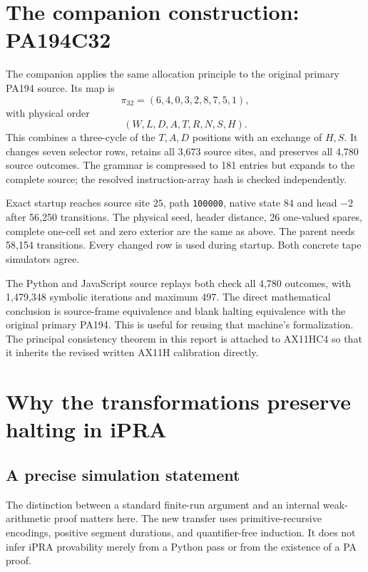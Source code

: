 \documentclass[11pt,letterpaper]{article}
\begin{document}


\section{The companion construction: PA194C32}

The companion applies the same allocation principle to the original primary PA194 source. Its map is
\[
       \boxed{\pi_{32}=(6,4,0,3,2,8,7,5,1),}
\]
with physical order
\[
       (W,L,D,A,T,R,N,S,H).
\]
This combines a three-cycle of the $T,A,D$ positions with an exchange of $H,S$. It changes seven selector rows, retains all 3,673 source sites, and preserves all 4,780 source outcomes. The grammar is compressed to 181 entries but expands to the complete source; the resolved instruction-array hash is checked independently.


Exact startup reaches source site $25$, path \texttt{100000}, native state $84$ and head $-2$ after 56,250 transitions. The physical seed, header distance, 26 one-valued spares, complete one-cell set and zero exterior are the same as above. The parent needs 58,154 transitions. Every changed row is used during startup. Both concrete tape simulators agree.

The Python and JavaScript source replays both check all 4,780 outcomes, with 1,479,348 symbolic iterations and maximum 497. The direct mathematical conclusion is source-frame equivalence and blank halting equivalence with the original primary PA194. This is useful for reusing that machine's formalization. The principal consistency theorem in this report is attached to AX11HC4 so that it inherits the revised written AX11H calibration directly.

\section{Why the transformations preserve halting in iPRA}
\subsection{A precise simulation statement}

The distinction between a standard finite-run argument and an internal weak-arithmetic proof matters here. The new transfer uses primitive-recursive encodings, positive segment durations, and quantifier-free induction. It does not infer iPRA provability merely from a Python pass or from the existence of a PA proof.
\end{document}
